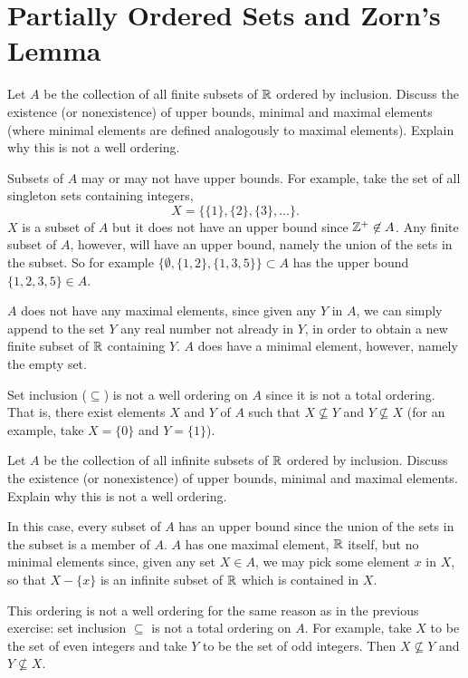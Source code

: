 \section{Partially Ordered Sets and Zorn's Lemma}

 Let $A$ be the collection of all finite subsets of $\mathbb{R}$
ordered by inclusion. Discuss the existence (or nonexistence) of upper
bounds, minimal and maximal elements (where minimal elements are
defined analogously to maximal elements). Explain why this is not a
well ordering.
\begin{solution}
  Subsets of $A$ may or may not have upper bounds. For example, take
  the set of all singleton sets containing integers,
  \begin{equation*}
    X = \{\{1\}, \{2\}, \{3\}, \dots\}.
  \end{equation*}
  $X$ is a subset of $A$ but it does not have an upper bound since
  $\mathbb{Z}^+\not\in A$. Any finite subset of $A$, however, will have an
  upper bound, namely the union of the sets in the subset. So for
  example $\{\emptyset, \{1,2\}, \{1,3,5\}\}\subset A$ has the upper
  bound $\{1,2,3,5\}\in A$.

  $A$ does not have any maximal elements, since given any $Y$ in $A$,
  we can simply append to the set $Y$ any real number not already in
  $Y$, in order to obtain a new finite subset of $\mathbb{R}$ containing
  $Y$. $A$ does have a minimal element, however, namely the empty set.

  Set inclusion ($\subseteq$) is not a well ordering on $A$ since it
  is not a total ordering. That is, there exist elements $X$ and $Y$
  of $A$ such that $X\not\subseteq Y$ and $Y\not\subseteq X$ (for an
  example, take $X = \{0\}$ and $Y = \{1\}$).
\end{solution}

 Let $A$ be the collection of all infinite subsets of $\mathbb{R}$
ordered by inclusion. Discuss the existence (or nonexistence) of upper
bounds, minimal and maximal elements. Explain why this is not a well
ordering.
\begin{solution}
  In this case, every subset of $A$ has an upper bound since the union
  of the sets in the subset is a member of $A$. $A$ has one maximal
  element, $\mathbb{R}$ itself, but no minimal elements since, given any set
  $X\in A$, we may pick some element $x$ in $X$, so that $X - \{x\}$
  is an infinite subset of $\mathbb{R}$ which is contained in $X$.

  This ordering is not a well ordering for the same reason as in the
  previous exercise: set inclusion $\subseteq$ is not a total ordering
  on $A$. For example, take $X$ to be the set of even integers and
  take $Y$ to be the set of odd integers. Then $X\not\subseteq Y$ and
  $Y\not\subseteq X$.
\end{solution}

